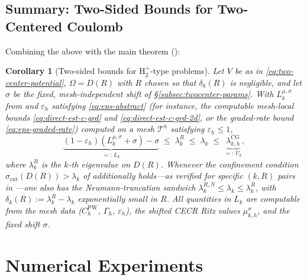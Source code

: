 \documentclass[11pt]{article}
\theoremstyle{plain}
\newtheorem{corollary}{Corollary}
\theoremstyle{definition}
\theoremstyle{remark}
\newcommand{\CG}{\mathrm{CG}}
\begin{document}
\subsection{Summary: Two-Sided Bounds for Two-Centered Coulomb}
\label{subsec:twocenter-summary}

Combining the above with the main theorem ():

\begin{corollary}[Two-sided bounds for $\mathrm{H}_2^+$-type problems]
\label{cor:twocenter-bounds}
Let $V$ be as in \eqref{eq:two-center-potential},
$\Omega=D(R)$ with $R$ chosen so that $\delta_k(R)$ is negligible, and let $\sigma$ be the
fixed, mesh-independent shift of \S\ref{subsec:twocenter-params}.
With $L_k^{\mu,\sigma}$ from  and
$\varepsilon_h$ satisfying \eqref{eq:eps-abstract} (for instance,
the computable mesh-local bounds \eqref{eq:direct-est-c-grd} and
\eqref{eq:direct-est-c-grd-2d}, or the graded-rate bound
\eqref{eq:eps-graded-rate})
computed on a mesh $\mathcal{T}^h$ satisfying $\varepsilon_h\le 1$,
\begin{equation}
\label{eq:twocenter-final-bound}
  \underbrace{(1-\varepsilon_h)(L_k^{\mu,\sigma}+\sigma)
  - \sigma}_{=:\,L_k}
  \;\le\; \lambda_k^R
  \;\le\; \lambda_k
  \;\le\;
  \underbrace{\lambda_{k,h}^{\CG}}_{=:\,U_k},
\end{equation}
where $\lambda_k^R$ is the $k$-th eigenvalue on $D(R)$.
Whenever the confinement condition
$\sigma_{\mathrm{ext}}(D(R)) > \lambda_k$ of
 additionally holds---as verified for
specific $(k,R)$ pairs in ---one
also has the Neumann-truncation sandwich
$\lambda_k^{R,N} \le \lambda_k \le \lambda_k^R$,
with $\delta_k(R) := \lambda_k^R - \lambda_k$ exponentially
small in $R$.  All quantities in
$L_k$ are computable from the mesh data ($C_h^{\mathrm{PW}}$,
$\Gamma_h$, $\varepsilon_h$), the shifted CECR Ritz values $\mu_{k,h}^\sigma$,
and the fixed shift $\sigma$.
\end{corollary}

\section{Numerical Experiments}
\label{sec:numerics}
\end{document}
